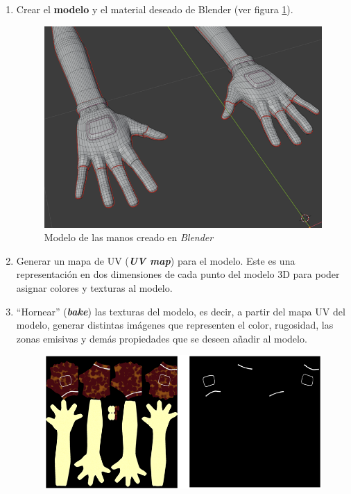 \begin{enumerate}
    \item Crear el \textbf{modelo} y el material deseado de Blender (ver figura \ref{fig:modeloManos}).
    \begin{figure}[h]
	\centering
	\includegraphics[scale=0.4]{img/ArmsModel.png}
	\caption{Modelo de las manos creado en \textit{Blender}}
	\label{fig:modeloManos}
    \end{figure}
    \item Generar un mapa de UV (\textbf{\textit{UV map}}) para el modelo. Este es una representación en dos dimensiones de cada punto del modelo 3D para poder asignar colores y texturas al modelo.
    \item ``Hornear'' (\textbf{\textit{bake}}) las texturas del modelo, es decir, a partir del mapa UV del modelo, generar distintas imágenes que representen el color, rugosidad, las zonas emisivas y demás propiedades que se deseen añadir al modelo.
    \begin{figure}[h]
	\centering
	\includegraphics[scale=0.4]{img/ArmsTextures.png}

\end{figure}
\end{enumerate}
